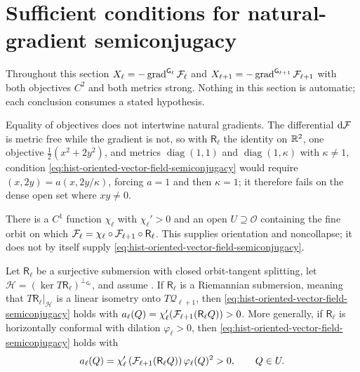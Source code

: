 \section{Sufficient conditions for natural-gradient semiconjugacy}
\label{sec:hist-natural-gradient-semiconjugacy}

Throughout this section $X_\ell=-\operatorname{grad}^{\mathsf G_\ell}\mathcal F_\ell$
and $X_{\ell+1}=-\operatorname{grad}^{\mathsf G_{\ell+1}}\mathcal F_{\ell+1}$ with
both objectives $C^2$ and both metrics strong.  Nothing in this section is
automatic; each conclusion consumes a stated hypothesis.

Equality of objectives does not intertwine natural gradients.  The differential
$\mathrm d\mathcal F$ is metric free while the gradient is not, so with
$\mathsf R_\ell$ the identity on $\mathbb R^2$, one objective
$\tfrac12(x^2+2y^2)$, and metrics $\operatorname{diag}(1,1)$ and
$\operatorname{diag}(1,\kappa)$ with $\kappa\ne1$, condition
\eqref{eq:hist-oriented-vector-field-semiconjugacy} would require
$(x,2y)=a(x,2y/\kappa)$, forcing $a=1$ and then $\kappa=1$; it therefore fails
on the dense open set where $xy\ne0$.  

There is a $C^1$ function $\chi_\ell$ with $\chi_\ell'>0$ and an open
$U\supseteq\mathscr O$ containing the fine orbit on which
$\mathcal F_\ell=\chi_\ell\circ\mathcal F_{\ell+1}\circ\mathsf R_\ell$.  This
supplies orientation and noncollapse; it does not by itself supply
\eqref{eq:hist-oriented-vector-field-semiconjugacy}.  

Let $\mathsf R_\ell$ be a surjective submersion with closed orbit-tangent
splitting, let $\mathcal H=(\ker T\mathsf R_\ell)^{\perp_{\mathsf G_\ell}}$, and
assume .  If $\mathsf R_\ell$ is a
Riemannian submersion, meaning that $T\mathsf R_\ell|_{\mathcal H}$ is a linear
isometry onto $T\mathcal Q_{\ell+1}$, then
\eqref{eq:hist-oriented-vector-field-semiconjugacy} holds with
$a_\ell(Q)=\chi_\ell'(\mathcal F_{\ell+1}(\mathsf R_\ell Q))>0$.  More generally,
if $\mathsf R_\ell$ is horizontally
conformal with dilation $\varphi_\ell>0$, then
\eqref{eq:hist-oriented-vector-field-semiconjugacy} holds with
\begin{equation}
a_\ell(Q)
=\chi_\ell'\left(\mathcal F_{\ell+1}(\mathsf R_\ell Q)\right)
\varphi_\ell(Q)^2>0,
\qquad Q\in U.
\label{eq:hist-conformal-semiconjugacy-factor}
\end{equation}

